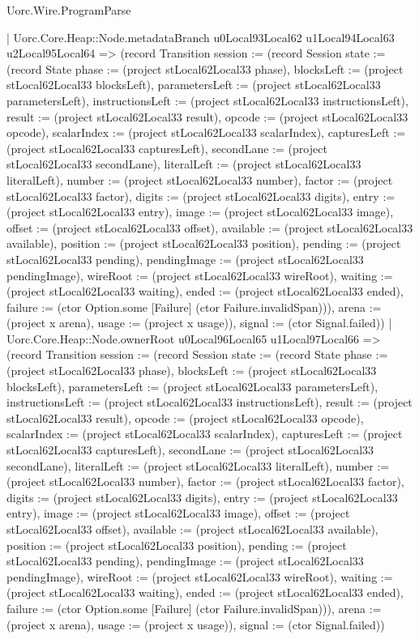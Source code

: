 \begin{lexlean}{Uorc.Wire.ProgramParse}
\begin{semanticmodule}
{        | Uorc.Core.Heap::Node.metadataBranch u0Local93Local62 u1Local94Local63 u2Local95Local64 => (record Transition {session := (record Session {state := (record State {phase := (project stLocal62Local33 phase), blocksLeft := (project stLocal62Local33 blocksLeft), parametersLeft := (project stLocal62Local33 parametersLeft), instructionsLeft := (project stLocal62Local33 instructionsLeft), result := (project stLocal62Local33 result), opcode := (project stLocal62Local33 opcode), scalarIndex := (project stLocal62Local33 scalarIndex), capturesLeft := (project stLocal62Local33 capturesLeft), secondLane := (project stLocal62Local33 secondLane), literalLeft := (project stLocal62Local33 literalLeft), number := (project stLocal62Local33 number), factor := (project stLocal62Local33 factor), digits := (project stLocal62Local33 digits), entry := (project stLocal62Local33 entry), image := (project stLocal62Local33 image), offset := (project stLocal62Local33 offset), available := (project stLocal62Local33 available), position := (project stLocal62Local33 position), pending := (project stLocal62Local33 pending), pendingImage := (project stLocal62Local33 pendingImage), wireRoot := (project stLocal62Local33 wireRoot), waiting := (project stLocal62Local33 waiting), ended := (project stLocal62Local33 ended), failure := (ctor Option.some [Failure] (ctor Failure.invalidSpan))}), arena := (project x arena), usage := (project x usage)}), signal := (ctor Signal.failed)})
        | Uorc.Core.Heap::Node.ownerRoot u0Local96Local65 u1Local97Local66 => (record Transition {session := (record Session {state := (record State {phase := (project stLocal62Local33 phase), blocksLeft := (project stLocal62Local33 blocksLeft), parametersLeft := (project stLocal62Local33 parametersLeft), instructionsLeft := (project stLocal62Local33 instructionsLeft), result := (project stLocal62Local33 result), opcode := (project stLocal62Local33 opcode), scalarIndex := (project stLocal62Local33 scalarIndex), capturesLeft := (project stLocal62Local33 capturesLeft), secondLane := (project stLocal62Local33 secondLane), literalLeft := (project stLocal62Local33 literalLeft), number := (project stLocal62Local33 number), factor := (project stLocal62Local33 factor), digits := (project stLocal62Local33 digits), entry := (project stLocal62Local33 entry), image := (project stLocal62Local33 image), offset := (project stLocal62Local33 offset), available := (project stLocal62Local33 available), position := (project stLocal62Local33 position), pending := (project stLocal62Local33 pending), pendingImage := (project stLocal62Local33 pendingImage), wireRoot := (project stLocal62Local33 wireRoot), waiting := (project stLocal62Local33 waiting), ended := (project stLocal62Local33 ended), failure := (ctor Option.some [Failure] (ctor Failure.invalidSpan))}), arena := (project x arena), usage := (project x usage)}), signal := (ctor Signal.failed)})
}
\end{semanticmodule}
\end{lexlean}
